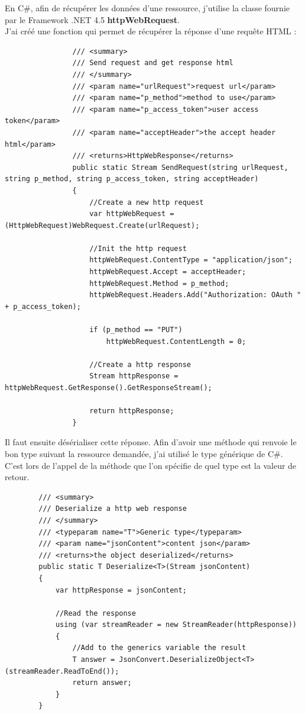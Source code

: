 \documentclass[11pt]{report} %
\begin{document}
		En C\#, afin de récupérer les données d'une ressource, j'utilise la classe fournie par le Framework .NET 4.5 \textbf{httpWebRequest}.\\		
		J'ai créé une fonction qui permet de récupérer la réponse d'une requête HTML :
		
		\begin{lstlisting}
		        /// <summary>
		        /// Send request and get response html
		        /// </summary>
		        /// <param name="urlRequest">request url</param>
		        /// <param name="p_method">method to use</param>
		        /// <param name="p_access_token">user access token</param>
		        /// <param name="acceptHeader">the accept header html</param>
		        /// <returns>HttpWebResponse</returns>
		        public static Stream SendRequest(string urlRequest, string p_method, string p_access_token, string acceptHeader)
		        {
			        //Create a new http request
			        var httpWebRequest = (HttpWebRequest)WebRequest.Create(urlRequest);
			        
			        //Init the http request
			        httpWebRequest.ContentType = "application/json";
			        httpWebRequest.Accept = acceptHeader;
			        httpWebRequest.Method = p_method;
			        httpWebRequest.Headers.Add("Authorization: OAuth " + p_access_token);
			        
			        if (p_method == "PUT")
				        httpWebRequest.ContentLength = 0;
			        
			        //Create a http response
			        Stream httpResponse = httpWebRequest.GetResponse().GetResponseStream();
			        
			        return httpResponse;
		        }
		\end{lstlisting}
		
		Il faut ensuite désérialiser cette réponse. Afin d’avoir une méthode qui renvoie le bon type suivant la ressource demandée, j’ai utilisé le type générique de C\#. C'est lors de l'appel de la méthode que l'on spécifie de quel type est la valeur de retour.
		
		\begin{lstlisting}
		/// <summary>
		/// Deserialize a http web response
		/// </summary>
		/// <typeparam name="T">Generic type</typeparam>
		/// <param name="jsonContent">content json</param>
		/// <returns>the object deserialized</returns>
		public static T Deserialize<T>(Stream jsonContent)
		{
			var httpResponse = jsonContent;
			
			//Read the response
			using (var streamReader = new StreamReader(httpResponse))
			{
				//Add to the generics variable the result
				T answer = JsonConvert.DeserializeObject<T>(streamReader.ReadToEnd());
				return answer;
			}
		}
		\end{lstlisting}
		
\end{document}

